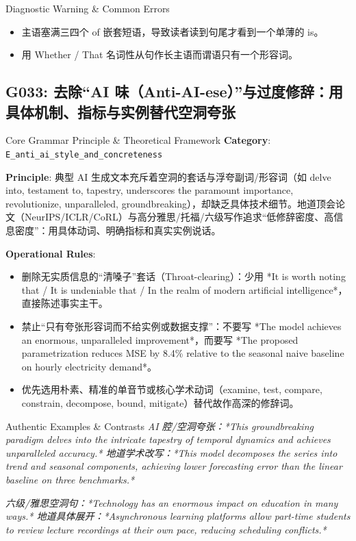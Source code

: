 \begin{TipBox}{Diagnostic Warning \& Common Errors}
\begin{itemize}[leftmargin=1.5em, itemsep=1pt]
  \item 主语塞满三四个 of 嵌套短语，导致读者读到句尾才看到一个单薄的 is。
  \item 用 Whether / That 名词性从句作长主语而谓语只有一个形容词。
\end{itemize}
\end{TipBox}
\vspace{6pt}
\subsection{G033: 去除“AI 味（Anti-AI-ese）”与过度修辞：用具体机制、指标与实例替代空洞夸张}\label{sec:rule:G033}
\begin{ConceptBox}{Core Grammar Principle \& Theoretical Framework}
\textbf{Category}: \texttt{E\_anti\_ai\_style\_and\_concreteness}\par\vspace{3pt}
\textbf{Principle}: 典型 AI 生成文本充斥着空洞的套话与浮夸副词/形容词（如 delve into, testament to, tapestry, underscores the paramount importance, revolutionize, unparalleled, groundbreaking），却缺乏具体技术细节。地道顶会论文（NeurIPS/ICLR/CoRL）与高分雅思/托福/六级写作追求“低修辞密度、高信息密度”：用具体动词、明确指标和真实实例说话。\par\vspace{4pt}
\textbf{Operational Rules}:
\begin{itemize}[leftmargin=1.5em, itemsep=1pt]
  \item 删除无实质信息的“清嗓子”套话（Throat-clearing）：少用 *It is worth noting that / It is undeniable that / In the realm of modern artificial intelligence*，直接陈述事实主干。
  \item 禁止“只有夸张形容词而不给实例或数据支撑”：不要写 *The model achieves an enormous, unparalleled improvement*，而要写 *The proposed parametrization reduces MSE by 8.4\% relative to the seasonal naive baseline on hourly electricity demand*。
  \item 优先选用朴素、精准的单音节或核心学术动词（examine, test, compare, constrain, decompose, bound, mitigate）替代故作高深的修辞词。
\end{itemize}
\end{ConceptBox}
\begin{ExampleBox}{Authentic Examples \& Contrasts}
\textit{AI 腔/空洞夸张：*This groundbreaking paradigm delves into the intricate tapestry of temporal dynamics and achieves unparalleled accuracy.*
地道学术改写：*This model decomposes the series into trend and seasonal components, achieving lower forecasting error than the linear baseline on three benchmarks.*}\par\vspace{2pt}
\textit{六级/雅思空洞句：*Technology has an enormous impact on education in many ways.*
地道具体展开：*Asynchronous learning platforms allow part-time students to review lecture recordings at their own pace, reducing scheduling conflicts.*}\par\vspace{2pt}
\end{ExampleBox}
